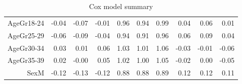 \begin{table}[ht]
\begin{tabular}{rrrrrrrrrr}
  AgeGr18-24 & -0.04 & -0.07 & -0.01 & 0.96 & 0.94 & 0.99 & 0.04 & 0.06 & 0.01 \\ 
  AgeGr25-29 & -0.06 & -0.09 & -0.04 & 0.94 & 0.91 & 0.96 & 0.06 & 0.09 & 0.04 \\ 
  AgeGr30-34 & 0.03 & 0.01 & 0.06 & 1.03 & 1.01 & 1.06 & -0.03 & -0.01 & -0.06 \\ 
  AgeGr35-39 & 0.02 & -0.00 & 0.05 & 1.02 & 1.00 & 1.05 & -0.02 & 0.00 & -0.05 \\ 
  SexM & -0.12 & -0.13 & -0.12 & 0.88 & 0.88 & 0.89 & 0.12 & 0.12 & 0.11 \\ 
   \hline
\end{tabular}
\caption{Cox model summary} 
\end{table}
